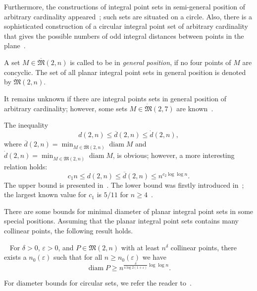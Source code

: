 \documentclass[11pt,twoside,draft
]{article}
\theoremstyle{plain}
\begin{document}
Furthermore, the constructions of integral point sets in semi-general position of arbitrary cardinality
appeared~\cite{harborth1993upper};
such sets are situated on a circle.
Also, there is a sophisticated construction of a circular integral point set of arbitrary cardinality
that gives the possible numbers of odd integral distances
between points in the plane~\cite{piepmeyer1996maximum}.


\begin{definition}
	A set $M\in\overline{\mathfrak{M}}(2,n)$ is called to be in \textit{general position},
	if no four points of $M$ are concyclic.
	The set of all planar integral point sets in general position
	is denoted by $\dot{\mathfrak{M}}(2,n)$.
\end{definition}

It remains unknown if there are integral points sets in general position of arbitrary cardinality;
however, some sets $M\in \dot{\mathfrak{M}}(2,7)$ are known~\cite{kreisel2008heptagon,kurz2013constructing}.

The inequality
\begin{equation*}
	d(2,n) \leq \overline{d}(2,n) \leq \dot{d}(2,n)
	,
\end{equation*}
where
$
	\overline{d}(2,n) = \min_{M\in\overline{\mathfrak{M}}(2,n)} \operatorname{diam} M
$
and
$
	\dot{d}(2,n) = \min_{M\in\dot{\mathfrak{M}}(2,n)} \operatorname{diam} M
$,
is obvious; however, a more interesting relation holds:
\begin{equation*}
	c_1 n \leq d(2,n) \leq \overline{d}(2,n) \leq n^{c_2 \log \log n}
	.
\end{equation*}
The upper bound is presented in~\cite{harborth1993upper}.
The lower bound was firstly introduced in~\cite{solymosi2003note};
the largest known value for $c_1$ is $5/11$ for $n\geq 4$~\cite{my-pps-linear-bound-2019}.


There are some bounds for minimal diameter of planar integral point sets in some special positions.
Assuming that the planar integral point sets contains many collinear points,
the following result holds.
\begin{theorem}~\cite[Theorem 4]{kurz2008minimum}
	For $\delta > 0$, $\varepsilon > 0$, and $P\in\mathfrak{M}(2,n)$ with
	at least $n^\delta$ collinear points, there exists a $n_0 (\varepsilon)$
	such that for all $n \geq n_0 (\varepsilon)$ we have
	\begin{equation}
		\operatorname{diam} P \geq n^{\frac{\delta}{4 \log 2(1+\varepsilon)}\log \log n}
		.
	\end{equation}
\end{theorem}
For diameter bounds for circular sets, we refer the reader to~\cite{bat2018number}.
\end{document}
